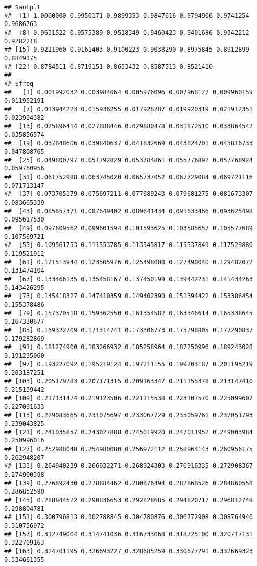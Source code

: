 \documentclass[
]{article}
\begin{document}
\begin{verbatim}
## $autplt
##  [1] 1.0000000 0.9950171 0.9899353 0.9847616 0.9794906 0.9741254 0.9686763
##  [8] 0.9631522 0.9575389 0.9518349 0.9460423 0.9401686 0.9342212 0.9282218
## [15] 0.9221960 0.9161403 0.9100223 0.9038290 0.8975845 0.8912899 0.8849175
## [22] 0.8784511 0.8719151 0.8653432 0.8587513 0.8521410
## 
## $freq
##   [1] 0.001992032 0.003984064 0.005976096 0.007968127 0.009960159 0.011952191
##   [7] 0.013944223 0.015936255 0.017928287 0.019920319 0.021912351 0.023904382
##  [13] 0.025896414 0.027888446 0.029880478 0.031872510 0.033864542 0.035856574
##  [19] 0.037848606 0.039840637 0.041832669 0.043824701 0.045816733 0.047808765
##  [25] 0.049800797 0.051792829 0.053784861 0.055776892 0.057768924 0.059760956
##  [31] 0.061752988 0.063745020 0.065737052 0.067729084 0.069721116 0.071713147
##  [37] 0.073705179 0.075697211 0.077689243 0.079681275 0.081673307 0.083665339
##  [43] 0.085657371 0.087649402 0.089641434 0.091633466 0.093625498 0.095617530
##  [49] 0.097609562 0.099601594 0.101593625 0.103585657 0.105577689 0.107569721
##  [55] 0.109561753 0.111553785 0.113545817 0.115537849 0.117529880 0.119521912
##  [61] 0.121513944 0.123505976 0.125498008 0.127490040 0.129482072 0.131474104
##  [67] 0.133466135 0.135458167 0.137450199 0.139442231 0.141434263 0.143426295
##  [73] 0.145418327 0.147410359 0.149402390 0.151394422 0.153386454 0.155378486
##  [79] 0.157370518 0.159362550 0.161354582 0.163346614 0.165338645 0.167330677
##  [85] 0.169322709 0.171314741 0.173306773 0.175298805 0.177290837 0.179282869
##  [91] 0.181274900 0.183266932 0.185258964 0.187250996 0.189243028 0.191235060
##  [97] 0.193227092 0.195219124 0.197211155 0.199203187 0.201195219 0.203187251
## [103] 0.205179283 0.207171315 0.209163347 0.211155378 0.213147410 0.215139442
## [109] 0.217131474 0.219123506 0.221115538 0.223107570 0.225099602 0.227091633
## [115] 0.229083665 0.231075697 0.233067729 0.235059761 0.237051793 0.239043825
## [121] 0.241035857 0.243027888 0.245019920 0.247011952 0.249003984 0.250996016
## [127] 0.252988048 0.254980080 0.256972112 0.258964143 0.260956175 0.262948207
## [133] 0.264940239 0.266932271 0.268924303 0.270916335 0.272908367 0.274900398
## [139] 0.276892430 0.278884462 0.280876494 0.282868526 0.284860558 0.286852590
## [145] 0.288844622 0.290836653 0.292828685 0.294820717 0.296812749 0.298804781
## [151] 0.300796813 0.302788845 0.304780876 0.306772908 0.308764940 0.310756972
## [157] 0.312749004 0.314741036 0.316733068 0.318725100 0.320717131 0.322709163
## [163] 0.324701195 0.326693227 0.328685259 0.330677291 0.332669323 0.334661355

\end{verbatim}
\end{document}
